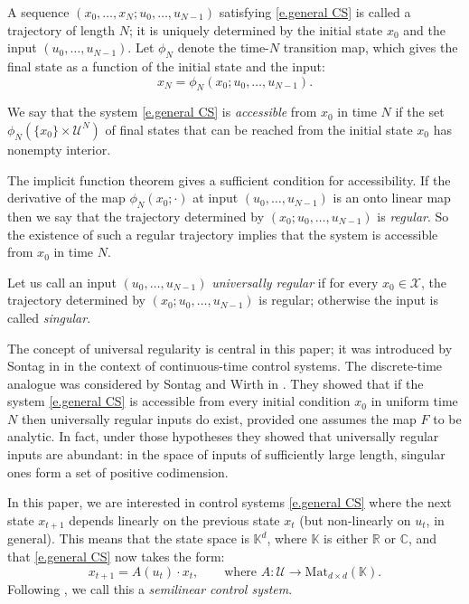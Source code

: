 \documentclass[10pt, a4paper]{amsart}
\theoremstyle{plain}
\theoremstyle{definition}
\theoremstyle{remark}
\theoremstyle{note}
\numberwithin{equation}{section}
\begin{document}
A sequence $(x_0, \dots, x_N ; u_0, \dots, u_{N-1})$ satisfying \eqref{e.general CS} is called a trajectory of length $N$; it is uniquely determined by the initial state $x_0$ and the 
input 
$(u_0,\dots,u_{N-1})$.
Let $\phi_N$ denote the time-$N$ transition map,
which gives the final state as a function of the initial state and the input:
\begin{equation}\label{e.final state}
x_N = \phi_N(x_0; u_0, \dots, u_{N-1}).
\end{equation}

We say that the system \eqref{e.general CS} is \emph{accessible} from $x_0$ in time $N$ if 
the set $\phi_N(\{x_0\} \times {\mathcal{U}}^N)$ 
of final states that can be reached from the initial state $x_0$ 
has nonempty interior.

The implicit function theorem gives a sufficient condition for accessibility.
If the derivative of the map $\phi_N(x_0; \cdot)$ at input $(u_0,\dots,u_{N-1})$
is an onto linear map 
then we say that the trajectory determined by $(x_0; u_0, \dots, u_{N-1})$ is \emph{regular}.
So the existence of such a regular trajectory implies that the system
is accessible from $x_0$ in time $N$.

\medskip

Let us call an input $(u_0, \dots, u_{N-1})$ \emph{universally regular}
if for every $x_0 \in {\mathcal{X}}$, the trajectory determined by $(x_0; u_0, \dots, u_{N-1})$ is regular;
otherwise the input is called \emph{singular}.

The concept of universal regularity is central in this paper; 
it was introduced by Sontag 
in \cite{Sontag_92} in the context of continuous-time control systems. The discrete-time analogue was considered by Sontag and Wirth in \cite{Sontag_Wirth_98}.
They showed that if the system \eqref{e.general CS} is accessible from every initial condition $x_0$ 
in uniform time $N$ then universally regular inputs do exist, provided one assumes the map $F$ to be analytic. In fact, under those hypotheses they showed that universally regular inputs are abundant: in the space of inputs of sufficiently large length, singular ones form a set of positive codimension.

\medskip

In this paper, we are interested in control systems \eqref{e.general CS} where
the next state $x_{t+1}$ depends linearly on the previous state $x_t$ 
(but non-linearly on $u_t$, in general). 
This means that the state space is ${\mathbb{K}}^d$,
where ${\mathbb{K}}$ is either ${\mathbb{R}}$ or ${\mathbb{C}}$,
and that \eqref{e.general CS} now takes the form: 
\begin{equation}\label{e.semilin CS}
x_{t+1} = A(u_t) \cdot x_t, \qquad \text{where } A \colon {\mathcal{U}} \to {\mathrm{Mat}}_{d \times d}({\mathbb{K}}).
\end{equation}
Following \cite{CK_93}, we call this a \emph{semilinear control system}.
\end{document}
